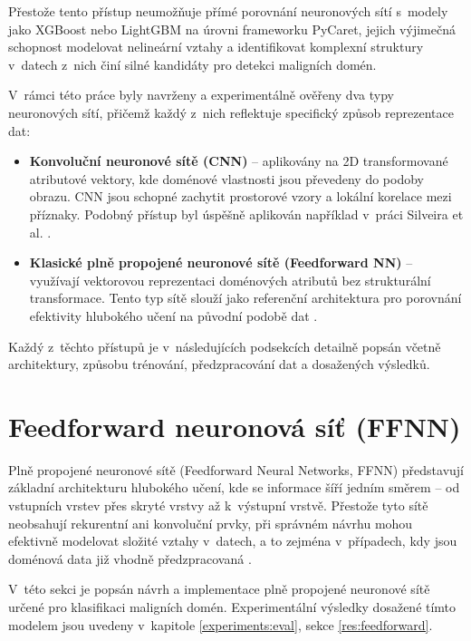 Přestože tento přístup neumožňuje přímé porovnání neuronových sítí s~modely jako XGBoost nebo LightGBM na úrovni frameworku PyCaret, jejich výjimečná schopnost modelovat nelineární vztahy a identifikovat komplexní struktury v~datech z~nich činí silné kandidáty pro detekci maligních domén.

V~rámci této práce byly navrženy a experimentálně ověřeny dva typy neuronových sítí, přičemž každý z~nich reflektuje specifický způsob reprezentace dat:

\begin{itemize}

        \item \textbf{Konvoluční neuronové sítě (CNN)} – aplikovány na 2D transformované atributové vektory, kde doménové vlastnosti jsou převedeny do podoby obrazu. CNN jsou schopné zachytit prostorové vzory a lokální korelace mezi příznaky. Podobný přístup byl úspěšně aplikován například v~práci Silveira et al. \cite{silveira2021detection}.
    
    \item \textbf{Klasické plně propojené neuronové sítě (Feedforward NN)} – využívají vektorovou reprezentaci doménových atributů bez strukturální transformace. Tento typ sítě slouží jako referenční architektura pro porovnání efektivity hlubokého učení na původní podobě dat \cite{ml_general}.
\end{itemize}

Každý z~těchto přístupů je v~následujících podsekcích detailně popsán včetně architektury, způsobu trénování, předzpracování dat a dosažených výsledků.



\section{Feedforward neuronová síť (FFNN)}

Plně propojené neuronové sítě (Feedforward Neural Networks, FFNN) představují základní architekturu hlubokého učení, kde se informace šíří jedním směrem – od vstupních vrstev přes skryté vrstvy až k~výstupní vrstvě. Přestože tyto sítě neobsahují rekurentní ani konvoluční prvky, při správném návrhu mohou efektivně modelovat složité vztahy v~datech, a to zejména v~případech, kdy jsou doménová data již vhodně předzpracovaná \cite{goodfellow2016deep}.

V~této sekci je popsán návrh a implementace plně propojené neuronové sítě určené pro klasifikaci maligních domén. Experimentální výsledky dosažené tímto modelem jsou uvedeny v~kapitole \ref{experiments:eval}, sekce \ref{res:feedforward}.

